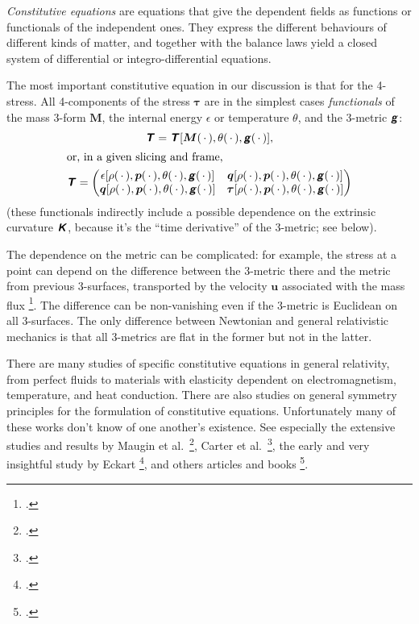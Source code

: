 \documentclass[\ifafour a4paper,12pt,\else a5paper,10pt,\fi%
onecolumn,oneside,article,%
british%
]{memoir}
\theoremstyle{remark}
\theoremstyle{innote}
\newcommand*{\mathte}[1]{\textbf{\textit{\textsf{#1}}}}
\newcommand*{\citep}{\footcites}%
\newcommand*{\dotv}{\mathord{\,\cdot\,}}%
\renewcommand*{\|}{\nonscript\,\vert\nonscript\;\mathopen{}}
\newcommand*{\etal}{{et al.}}
\newcommand*{\ydd}{\rho}
\newcommand*{\yd}{\ydd}
\newcommand*{\yrr}{M}
\newcommand*{\yr}{\bm{\yrr}}
\newcommand*{\ycc}{u}
\newcommand*{\yc}{\bm{\ycc}}
\newcommand*{\yjj}{p}
\newcommand*{\yj}{\bm{\yjj}}
\newcommand*{\yqq}{q}
\newcommand*{\yq}{\bm{\yqq}}
\newcommand*{\yTT}{\tau}
\newcommand*{\yT}{\bm{\yTT}}
\newcommand*{\yTTf}{T}
\newcommand*{\yTf}{\mathte{\yTTf}}
\newcommand*{\ygg}{g}
\newcommand*{\yg}{\mathte{\ygg}}
\newcommand*{\yKK}{K}
\newcommand*{\yK}{\mathte{\yKK}}
\newcommand*{\ypp}{q}
\newcommand*{\yp}{\bm{\ypp}}
\newcommand*{\ye}{\epsilon}
\newcommand*{\yte}{\theta}
\begin{document}
\emph{Constitutive equations} are equations that give the dependent fields
as functions or functionals of the independent ones. They express the
different behaviours of different kinds of matter, and together with the
balance laws yield a closed system of differential or integro-differential
equations.

The most important constitutive equation in our discussion is that for the
4-stress. All 4-components of the stress $\yT$ are in the simplest cases
\emph{functionals} of the mass 3-form $\yr$, the internal energy $\ye$ or
temperature $\yte$, and the 3-metric $\yg$:
\begin{subequations}\label{eq:constitutive_4stress}
  \begin{gather}
    \label{eq:constit_T_with_mass_geometry}
    \yTf=\yTf[\yr(\dotv),\yte(\dotv),\yg(\dotv)],
    \\
    \shortintertext{or, in a given slicing and frame,}
    \label{eq:4stress_components}
    \yTf =
    \begin{pmatrix}
      \ye[\yd(\dotv),\yj(\dotv),\yte(\dotv),\yg(\dotv)] & \yq[\yd(\dotv),\yj(\dotv),\yte(\dotv),\yg(\dotv)] \\
      \yp[\yd(\dotv),\yj(\dotv),\yte(\dotv),\yg(\dotv)] & \yT[\yd(\dotv),\yj(\dotv),\yte(\dotv),\yg(\dotv)]
    \end{pmatrix}
  \end{gather}
\end{subequations}
(these functionals indirectly include a possible dependence on the
extrinsic curvature $\yK$, because it's the \enquote{time derivative} of
the 3-metric; see below).

The dependence on the metric can be complicated: for example, the stress at
a point can depend on the difference between the 3-metric there and the
metric from previous 3-surfaces, transported by the velocity $\yc$
associated with the mass flux \citep{grotetal1966,carteretal1972}. The
difference can be non-vanishing even if the 3-metric is Euclidean on all
3-surfaces. The only difference between Newtonian and general relativistic
mechanics is that all 3-metrics are flat in the former but not in the
latter.

There are many studies of specific constitutive equations in general
relativity, from perfect fluids to materials with elasticity dependent on
electromagnetism, temperature, and heat conduction. There are also studies
on general symmetry principles for the formulation of constitutive
equations. Unfortunately many of these works don't know of one another's
existence. See especially the extensive studies and results by Maugin
\etal\
\citep{maugin1971,maugin1971b,mauginetal1972,mauginetal1972b,maugin1973,maugin1974,maugin1974b,maugin1978,maugin1978b,maugin1978c,maugin1978d,maugin1978e},
Carter \etal\ \citep{carteretal1972,carter1973,carteretal2006}, the early
and very insightful study by Eckart \citep{eckart1940c}, and others
articles and books
\citep{bressan1964b,lianis1973,bertottietal1984,hiscocketal1985,anileetal1989,gerochetal1991,herrmannetal2000,bossavit2001b,geroch2001,gourgoulhon2007_r2012,alcubierre2008,choquetbruhat2009,baumgarteetal2010,rezzollaetal2013,disconzi2014,pimenteletal2016,disconzietal2017}.
\end{document}
